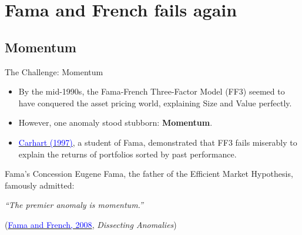 \documentclass{beamer}
\begin{document}
\section{Fama and French fails again}

\subsection{Momentum}

\begin{frame}{The Challenge: Momentum}
	\begin{itemize}
		\item By the mid-1990s, the Fama-French Three-Factor Model (FF3) seemed to have conquered the asset pricing world, explaining Size and Value perfectly.
		\item However, one anomaly stood stubborn: \textbf{Momentum}.
		\item \href{https://doi.org/10.1111/j.1540-6261.1997.tb03808.x}{\textcolor{blue}{Carhart (1997)}}, a student of Fama, demonstrated that FF3 fails miserably to explain the returns of portfolios sorted by past performance.
	\end{itemize}
	
	\vspace{0.3cm}
	\begin{block}{Fama's Concession}
		Eugene Fama, the father of the Efficient Market Hypothesis, famously admitted:
		\begin{center}
			\textit{``The premier anomaly is momentum.''}
		\end{center}
		\footnotesize (\href{https://doi.org/10.1111/j.1540-6261.2008.01371.x}{\textcolor{blue}{Fama and French, 2008}}, \textit{Dissecting Anomalies})
	\end{block}
\end{frame}
\end{document}
